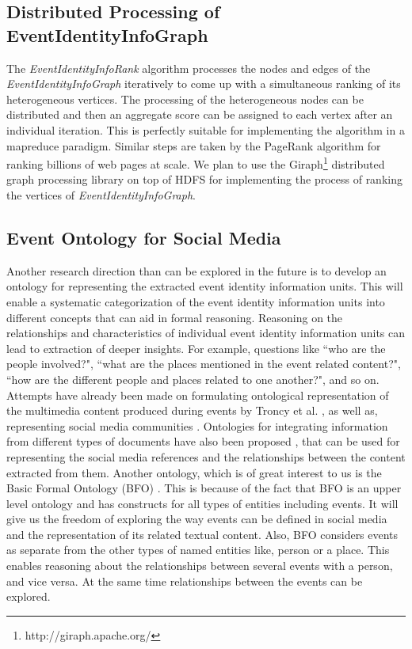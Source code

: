 \subsection{Distributed Processing of EventIdentityInfoGraph}
The \textit{EventIdentityInfoRank} algorithm processes the nodes and edges of the \textit{EventIdentityInfoGraph} iteratively to come up with a simultaneous ranking of its heterogeneous vertices. The processing of the heterogeneous nodes can be distributed and then an aggregate score can be assigned to each vertex after an individual iteration. This is perfectly suitable for implementing the algorithm in a mapreduce paradigm. Similar steps are taken by the PageRank algorithm for ranking billions of web pages at scale. We plan to use the Giraph\footnote{http://giraph.apache.org/} distributed graph processing library on top of HDFS for implementing the process of ranking the vertices of \textit{EventIdentityInfoGraph}.

\subsection{Event Ontology for Social Media}
Another research direction than can be explored in the future is to develop  an ontology for representing the extracted event identity information units. This will enable a systematic categorization of the event identity information units into different concepts that can aid in formal reasoning. Reasoning on the relationships and characteristics of individual event identity information units can lead to extraction of deeper insights. For example, questions like ``who are the people involved?", ``what are the places mentioned in the event related content?", ``how are the different people and places related to one another?", and so on. Attempts have already been made on formulating ontological representation of the multimedia content produced during events by Troncy et al. \cite{troncy2010linking}, as well as, representing social media communities \cite{breslinsemantically}. Ontologies for integrating information from different types of documents have also been proposed \cite{doerr2006towards}, that can be used for representing the social media references and the relationships between the content extracted from them. Another ontology, which is of great interest to us is the Basic Formal Ontology (BFO) \cite{smith2002basic}. This is because of the fact that BFO is an upper level ontology and has constructs for all types of entities including events. It will give us the freedom of exploring the way events can be defined in social media and the representation of its related textual content. Also, BFO considers events as separate from the other types of named entities like, person or a place. This enables reasoning about the relationships between several events with a person, and vice versa. At the same time relationships between the events can be explored.